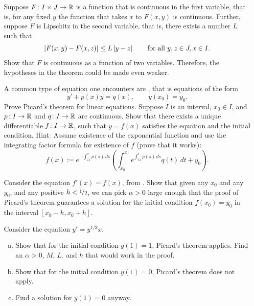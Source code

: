 \begin{exercise}
Suppose $F \colon I \times J \to {\mathbb{R}}$
is a function that is continuous in the first variable,
that is, for any fixed $y$ the function that takes $x$ to $F(x,y)$ is
continuous.  Further, suppose $F$ is Lipschitz in the second variable,
that is, there exists a number $L$ such that
\begin{equation*}
\left\lvert {F(x,y) - F(x,z)} \right\rvert \leq L \left\lvert {y-z} \right\rvert
\qquad \text{for all } y,z \in J, x \in I .
\end{equation*}
Show that $F$ is continuous as a function of two variables.  Therefore, the
hypotheses in the theorem could be made even weaker.
\end{exercise}

\begin{exercise}
A common type of equation one encounters are
\emph{}, that is
equations of the form
\begin{equation*}
y' + p(x) y = q(x) , \qquad y(x_0) = y_0 .
\end{equation*}
Prove Picard's theorem for linear equations.  Suppose $I$ is an
interval, $x_0 \in I$, and $p \colon I \to {\mathbb{R}}$ and $q \colon I \to {\mathbb{R}}$ are
continuous.
Show that there exists a unique differentiable $f \colon I \to {\mathbb{R}}$,
such that $y = f(x)$
satisfies the equation and the initial condition.
Hint: Assume existence of the exponential function and use the integrating
factor formula for existence of $f$ (prove that it works):
\begin{equation*}
f(x) := e^{-\int_{x_0}^x p(s)\, ds} \left( \int_{x_0}^x e^{\int_{x_0}^t p(s)\, ds}
q(t) ~dt + y_0 \right).
\end{equation*}
\end{exercise}

\begin{exercise}
Consider the equation $f'(x) = f(x)$,
from .  Show that given any $x_0$
and any $y_0$, and any positive $h < \nicefrac{1}{2}$, we can pick $\alpha >
0$ large enough that the proof of Picard's theorem guarantees a solution
for the initial condition $f(x_0) = y_0$ in the interval
$[x_0-h,x_0+h]$.
\end{exercise}

\begin{exercise}
Consider the equation $y' = y^{1/3}x$.
\begin{enumerate}[a)]
\item
Show that for the initial condition $y(1)=1$, Picard's theorem applies.
Find an $\alpha > 0$, $M$, $L$, and $h$ that would work in the proof.
\item
Show that for the initial condition $y(1) = 0$, Picard's theorem
does not apply.
\item
Find a solution for $y(1) = 0$ anyway.
\end{enumerate}
\end{exercise}

